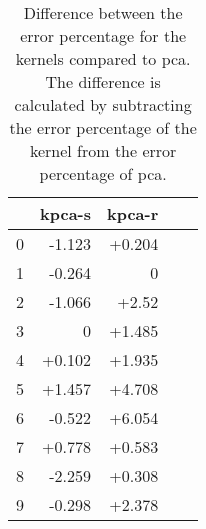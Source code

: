 \begin{table}[htb!]
    \centering
    \begin{tabular}{lrrrr}
        \toprule
           & kpca-s & kpca-r    \\
        \midrule
        0  & -1.123  & +0.204   \\
        1  & -0.264  & 0        \\
        2  & -1.066  & +2.52    \\
        3  &  0      & +1.485   \\
        4  & +0.102  & +1.935   \\
        5  & +1.457  & +4.708   \\
        6  & -0.522  & +6.054   \\
        7  & +0.778  & +0.583   \\
        8  & -2.259  &  +0.308  \\
        9  & -0.298  & +2.378   \\
        \bottomrule
    \end{tabular}
    \caption{Difference between the error percentage for the kernels compared to pca. The difference is calculated by subtracting the error percentage of the kernel from the error percentage of pca.}
    \label{tab:error-percentage-difference-pca-kpca-s-kpca-r}
\end{table}